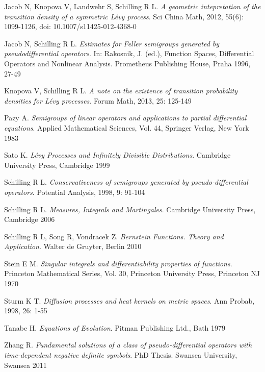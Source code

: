 \documentclass[a4paper, 12pt]{report}
\theoremstyle{cor}
\theoremstyle{remark}
\theoremstyle{definition}
\begin{document}
\begin{thebibliography}{99}
 Jacob N, Knopova V, Landwehr S, Schilling R L.  \emph{A geometric intepretation of the transition density of a symmetric L\'evy process}.  Sci China Math, 2012, 55(6): 1099-1126, doi: 10.1007/s11425-012-4368-0

 Jacob N, Schilling R L.  \emph{Estimates for Feller semigroups generated by pseudodifferential operators}.  In: Rakosnik, J. (ed.), Function Spaces, Differential Operators and Nonlinear Analysis.  Prometheus Publishing House, Praha 1996, 27-49

 Knopova V, Schilling R L.  \emph{A note on the existence of transition probability densities for L\'evy processes}.  Forum Math, 2013, 25: 125-149

 Pazy A.  \emph{Semigroups of linear operators and applications to partial differential equations}.  Applied Mathematical Sciences, Vol. 44, Springer Verlag, New York 1983

 Sato K.  \emph{L\'evy Processes and Infinitely Divisible Distributions}.  Cambridge University Press, Cambridge 1999

 Schilling R L.  \emph{Conservativeness of semigroups generated by pseudo-differential operators}.  Potential Analysis, 1998, 9: 91-104

 Schilling R L.  \emph{Measures, Integrals and Martingales}.  Cambridge University Press, Cambridge 2006

 Schilling R L, Song R, Vondracek Z.  \emph{Bernstein Functions.  Theory and Application}.  Walter de Gruyter, Berlin 2010

 Stein E M.  \emph{Singular integrals and differentiability properties of functions}.  Princeton Mathematical Series, Vol. 30, Princeton University Press, Princeton NJ 1970

 Sturm K T.  \emph{Diffusion processes and heat kernels on metric spaces}.  Ann Probab, 1998, 26: 1-55

 Tanabe H.  \emph{Equations of Evolution}.  Pitman Publishing Ltd., Bath 1979

 Zhang R. \emph{Fundamental solutions of a class of pseudo-differential operators with time-dependent negative definite symbols}.  PhD Thesis. Swansea University, Swansea 2011

\end{thebibliography}
\end{document}
